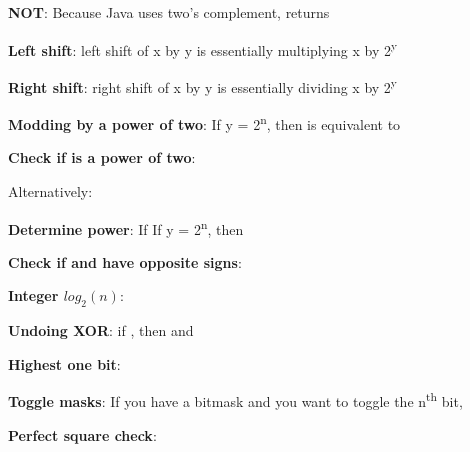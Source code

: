 
\textbf{NOT}: Because Java uses two's complement,  returns 

\textbf{Left shift}: left shift of x by y is essentially multiplying x by 2\textsuperscript{y}

\textbf{Right shift}: right shift of x by y is essentially dividing x by 2\textsuperscript{y}

\textbf{Modding by a power of two}: If y = 2\textsuperscript{n}, then  is equivalent to 

\textbf{Check if  is a power of two}: 

Alternatively: 

\textbf{Determine power}: If If y = 2\textsuperscript{n}, then 

\textbf{Check if  and  have opposite signs}: 

\textbf{Integer $log_2 (n)$}: 

\textbf{Undoing XOR}: if , then  and 

\textbf{Highest one bit}: 

\textbf{Toggle masks}: If you have a bitmask and you want to toggle the n\textsuperscript{th} bit, 

\textbf{Perfect square check}:






\newpage